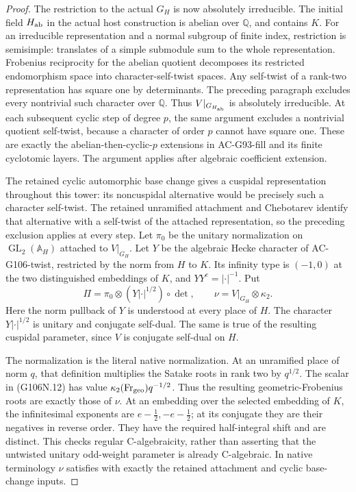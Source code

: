 \begin{proof}
The restriction to the actual \(G_H\) is now absolutely
irreducible. The initial field \(H_{\rm ab}\) in the
actual host construction is abelian over \(\mathbb Q\),
and contains \(K\). For an irreducible representation
and a normal subgroup of finite index, restriction is
semisimple: translates of a simple submodule sum to
the whole representation. Frobenius reciprocity for
the abelian quotient decomposes its restricted
endomorphism space into character-self-twist spaces.
Any self-twist of a rank-two representation has square
one by determinants. The preceding paragraph excludes
every nontrivial such character over \(\mathbb Q\).
Thus \(V|_{G_{H_{\rm ab}}}\) is absolutely irreducible.
At each subsequent cyclic step of degree \(p\), the same
argument excludes a nontrivial quotient self-twist,
because a character of order \(p\) cannot have square one.
These are exactly the abelian-then-cyclic-\(p\) extensions
in AC-G93-fill and its finite cyclotomic layers.
The argument applies after algebraic coefficient extension.

The retained cyclic automorphic base change gives a
cuspidal representation throughout this tower: its
noncuspidal alternative would be precisely such a
character self-twist. The retained unramified attachment
and Chebotarev identify that alternative with a self-twist
of the attached representation, so the preceding exclusion
applies at every step. Let \(\pi_0\) be the unitary
normalization on \(\operatorname{GL}_2(\mathbb A_H)\)
attached to \(V|_{G_H}\). Let \(Y\) be the algebraic
Hecke character of AC-G106-twist, restricted by the norm
from \(H\) to \(K\). Its infinity type is \((-1,0)\)
at the two distinguished embeddings of \(K\), and
\(YY^c=|\cdot|^{-1}\). Put
\[
           \Pi=\pi_0\otimes (Y|\cdot|^{1/2})\circ\det,
           \qquad \nu=V|_{G_H}\otimes\kappa_2.
\tag{G106N.12}
\]
Here the norm pullback of \(Y\) is understood at every
place of \(H\). The character \(Y|\cdot|^{1/2}\)
is unitary and conjugate self-dual. The same is true of
the resulting cuspidal parameter, since \(V\) is
conjugate self-dual on \(H\).

The normalization is the literal native 
normalization. At an unramified place of norm \(q\),
that definition multiplies the Satake roots in rank two
by \(q^{1/2}\). The scalar in (G106N.12) has value
\(\kappa_2(\operatorname{Fr}_{\rm geo})q^{-1/2}\).
Thus the resulting geometric-Frobenius roots are exactly
those of \(\nu\). At an embedding over the selected
embedding of \(K\), the infinitesimal exponents are
\(e-\tfrac12,-e-\tfrac12\); at its conjugate they
are their negatives in reverse order. They have the
required half-integral shift and are distinct. This
checks regular C-algebraicity, rather than asserting
that the untwisted unitary odd-weight parameter is
already C-algebraic. In native terminology
\(\nu\) satisfies  with exactly
the retained attachment and cyclic base-change inputs.


\end{proof}
